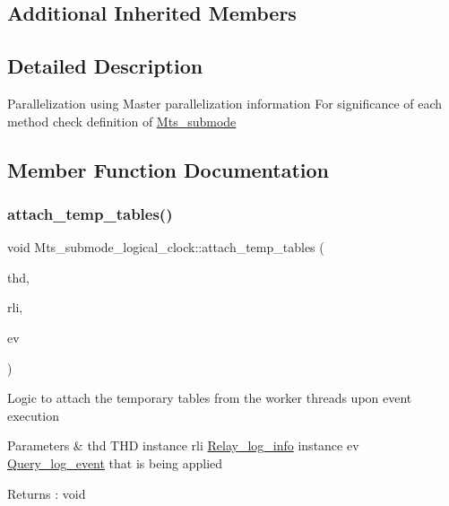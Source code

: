 \subsection*{Additional Inherited Members}


\subsection{Detailed Description}
Parallelization using Master parallelization information For significance of each method check definition of \mbox{\hyperlink{classMts__submode}{Mts\+\_\+submode}} 

\subsection{Member Function Documentation}
\mbox{\label{classMts__submode__logical__clock_a611d00eee05c4badebc630d80f0208fb}} 
\subsubsection{\texorpdfstring{attach\+\_\+temp\+\_\+tables()}{attach\_temp\_tables()}}
{\footnotesize\ttfamily void Mts\+\_\+submode\+\_\+logical\+\_\+clock\+::attach\+\_\+temp\+\_\+tables (\begin{DoxyParamCaption}\item[{T\+HD $\ast$}]{thd,  }\item[{const \mbox{\hyperlink{classRelay__log__info}{Relay\+\_\+log\+\_\+info}} $\ast$}]{rli,  }\item[{\mbox{\hyperlink{classQuery__log__event}{Query\+\_\+log\+\_\+event}} $\ast$}]{ev }\end{DoxyParamCaption})\hspace{0.3cm}{\ttfamily [virtual]}}

Logic to attach the temporary tables from the worker threads upon event execution 
\begin{DoxyParams}{Parameters}
{\em } & thd T\+HD instance rli \mbox{\hyperlink{classRelay__log__info}{Relay\+\_\+log\+\_\+info}} instance ev \mbox{\hyperlink{classQuery__log__event}{Query\+\_\+log\+\_\+event}} that is being applied \\
\hline
\end{DoxyParams}
\begin{DoxyReturn}{Returns}
\+: void 
\end{DoxyReturn}


